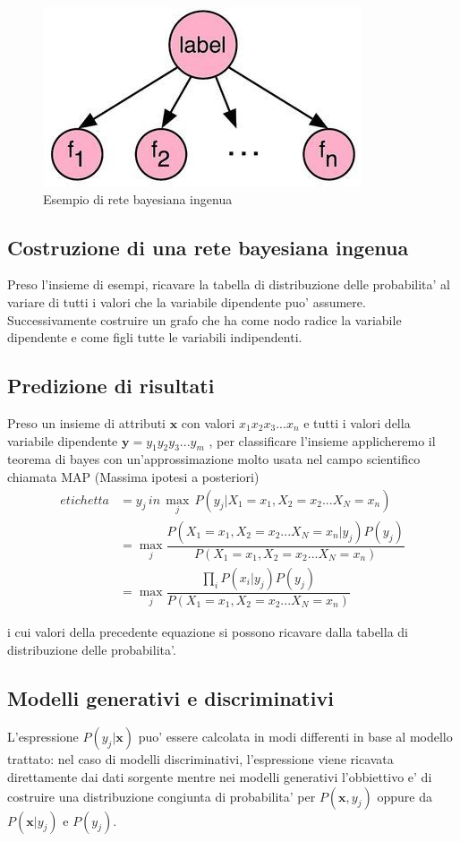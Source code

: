 \begin{figure}[H]
	\centering
	\includegraphics[width=0.4\linewidth]{img/naive_bayes_example}
	\caption{Esempio di rete bayesiana ingenua}
	\label{fig:naivebayesexample}
\end{figure}

\subsection*{Costruzione di una rete bayesiana ingenua}
Preso l'insieme di esempi, ricavare la tabella di distribuzione delle probabilita' al variare di tutti i valori che la variabile dipendente puo' assumere. Successivamente costruire un grafo che ha come nodo radice la variabile dipendente e come figli tutte le variabili indipendenti.
\medskip
\subsection*{Predizione di risultati}
Preso un insieme di attributi $\textbf{x}$ con valori $x_1x_2x_3...x_n$ e tutti i valori della variabile dipendente $\textbf{y}=y_1y_2y_3...y_m$ , per classificare l'insieme applicheremo il teorema di bayes con un'approssimazione molto usata nel campo scientifico chiamata MAP (Massima ipotesi a posteriori)
\begin{align*}
		etichetta &=y_j \, in \, \max_j\,P(y_j|X_1=x_1, X_2=x_2...X_N=x_n) \\
		&= \max_j \dfrac{P(X_1=x_1,X_2=x_2...X_N=x_n|y_j)P(y_j)}{P(X_1=x_1, X_2=x_2...X_N=x_n)}\\
		&= \max_j \dfrac{\prod_iP(x_i|y_j)P(y_j)}{P(X_1=x_1, X_2=x_2...X_N=x_n)}
\end{align*}

i cui valori della precedente equazione si possono ricavare dalla tabella di distribuzione delle probabilita'.

\subsection*{Modelli generativi e discriminativi}
L'espressione $P(y_j|\textbf{x})$ puo' essere calcolata in modi differenti in base al modello trattato: nel caso di modelli discriminativi, l'espressione viene ricavata direttamente dai dati sorgente mentre nei modelli generativi l'obbiettivo e' di costruire una distribuzione congiunta di probabilita' per $P(\textbf{x}, y_j)$ oppure da $P(\textbf{x}| y_j)$ e $P(y_j)$.

